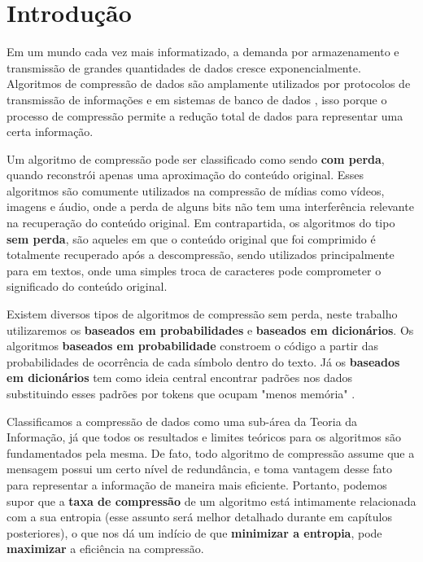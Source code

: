 \chapter*[Introdução]{Introdução}

Em um mundo cada vez mais informatizado, a demanda por armazenamento e transmissão de grandes quantidades de dados cresce exponencialmente.  
Algoritmos de compressão de dados são amplamente utilizados por protocolos de transmissão de informações \cite{MDN} e em sistemas de banco de dados \cite{MicDocs}, isso porque o processo de compressão permite a redução total de dados para representar uma certa informação.

Um algoritmo de compressão pode ser classificado como sendo \textbf{com perda}, quando reconstrói apenas uma aproximação do conteúdo original. 
Esses algoritmos são comumente utilizados na compressão de mídias como vídeos, imagens e áudio, onde a perda de alguns bits não tem uma interferência relevante na recuperação do conteúdo original. 
Em contrapartida, os algoritmos do tipo \textbf{sem perda}, são aqueles em que o conteúdo original que foi comprimido é totalmente recuperado após a descompressão, sendo utilizados principalmente para em textos, onde uma simples troca de caracteres pode comprometer o significado do conteúdo original. 

Existem diversos tipos de algoritmos de compressão sem perda, neste trabalho utilizaremos os \textbf{baseados em probabilidades} e \textbf{baseados em dicionários}. 
Os algoritmos \textbf{baseados em probabilidade} constroem o código a partir das probabilidades de ocorrência de cada símbolo dentro do texto. 
Já os \textbf{baseados em dicionários} tem como ideia central encontrar padrões nos dados substituindo esses padrões por tokens que ocupam "menos memória" \cite{Camb}.

Classificamos a compressão de dados como uma sub-área da Teoria da Informação, já que todos os resultados e limites teóricos para os algoritmos são fundamentados pela mesma. 
De fato, todo algoritmo de compressão assume que a mensagem possui um certo nível de redundância, e toma vantagem desse fato para representar a informação de maneira mais eficiente. 
Portanto, podemos supor que a \textbf{taxa de compressão} de um algoritmo está intimamente relacionada com a sua entropia (esse assunto será melhor detalhado durante em capítulos posteriores), o que nos dá um indício de que \textbf{minimizar a entropia}, pode \textbf{maximizar} a eficiência na compressão.

